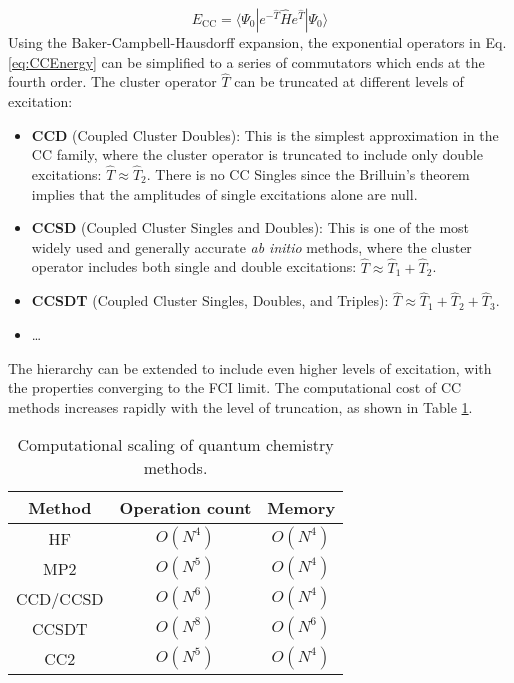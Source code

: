 \begin{equation}\label{eq:CCEnergy}
    E_{\mathrm{CC}}=\langle \Psi_{0} | e^{-\hat{T}} \hat{H} e^{\hat{T}} | \Psi_{0} \rangle
\end{equation}
Using the Baker-Campbell-Hausdorff expansion, the exponential operators in Eq. \ref{eq:CCEnergy} can be simplified to a series of commutators which ends at the fourth order. The cluster operator $\hat{T}$ can be truncated at different levels of excitation:
\begin{itemize}
    \item \textbf{CCD} (Coupled Cluster Doubles): This is the simplest approximation in the CC family, where the cluster operator is truncated to include only double excitations: $\hat{T} \approx \hat{T}_2$. There is no CC Singles since the Brilluin's theorem implies that the amplitudes of single excitations alone are null. 
    \item \textbf{CCSD} (Coupled Cluster Singles and Doubles): This is one of the most widely used and generally accurate \textit{ab initio} methods, where the cluster operator includes both single and double excitations: $\hat{T} \approx \hat{T}_1 + \hat{T}_2$.
    \item \textbf{CCSDT} (Coupled Cluster Singles, Doubles, and Triples): $\hat{T} \approx \hat{T}_1 + \hat{T}_2 + \hat{T}_3$.
    \item \ldots
\end{itemize}
The hierarchy can be extended to include even higher levels of excitation,  with the properties converging to the FCI limit. The computational cost of CC methods increases rapidly with the level of truncation, as shown in Table \ref{tab:qc_scaling}.
\begin{table}[h!]
    \centering
    \begin{tabular}{ccc}
        Method & Operation count & Memory \\
        \hline
        HF & $O(N^4)$ & $O(N^4)$ \\
        MP2 & $O(N^5)$ & $O(N^4)$ \\
        CCD/CCSD & $O(N^6)$ & $O(N^4)$ \\
        CCSDT & $O(N^8)$ & $O(N^6)$ \\
        CC2 & $O(N^{5})$ & $O(N^4)$ \\
    \end{tabular}
    \caption{Computational scaling of quantum chemistry methods.}
    \label{tab:qc_scaling}
\end{table}

